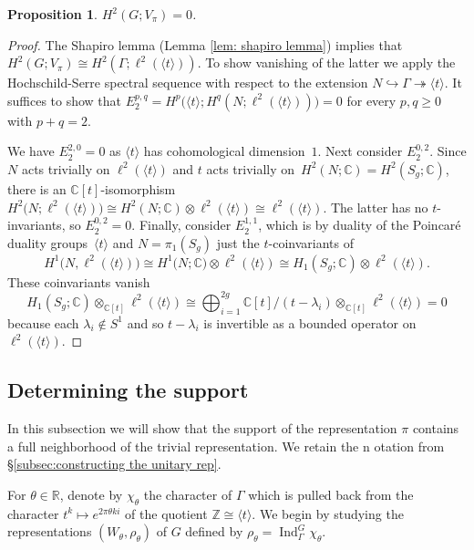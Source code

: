 \documentclass[12pt,reqno]{amsart}
\newcommand{\Z}{\mathbb{Z}}
\newcommand{\R}{\mathbb{R}}
\newcommand{\C}{\mathbb{C}}
\newtheorem{proposition}[theorem]{Proposition}
\theoremstyle{definition}
\newcommand{\Ind}{\operatorname{Ind}}
\begin{document}
\begin{proposition}\label{prop: H2pi=0}
 $H^2(G;V_\pi)=0$.
\end{proposition}

\begin{proof}
    The Shapiro lemma (Lemma \ref{lem: shapiro lemma}) implies that $H^2(G;V_\pi) \cong H^2(\Gamma;\ell^2(\langle t\rangle))$. To show vanishing of the latter we apply the Hochschild-Serre spectral sequence \cite[Theorem~9.1]{Blanc} with respect to the extension $N \hookrightarrow \Gamma \twoheadrightarrow \langle t \rangle$. It suffices to show that $E_2^{p,q}= H^p\bigl(\langle t \rangle; H^q(N;\ell^2(\langle t\rangle))\bigr)=0$ for every $p,q\ge 0$ with $p+q=2$. 

    We have $E_2^{2,0}=0$ as $\langle t\rangle$ has cohomological dimension~$1$. 
    Next consider $E_2^{0,2}$. 
    Since $N$ acts trivially on $\ell^2(\langle t\rangle)$ and $t$ acts trivially on~$H^2(N;\C)=H^2(S_g;\C)$,
    there is an $\C[t]$-isomorphism $H^2\bigl(N;\ell^2(\langle t\rangle)\bigr) \cong H^2(N;\C)\otimes \ell^2(\langle t\rangle)\cong \ell^2(\langle t\rangle)$.
    The latter has no $t$-invariants, so $E_2^{0,2}=0$. 
    Finally, consider $E_2^{1,1}$, which is by duality of the Poincar\'e duality groups~$\langle t\rangle$ and $N=\pi_1(S_g)$ just the $t$-coinvariants of
    \[ H^1\bigl( N, \ell^2(\langle t\rangle)\bigr)\cong H^1\bigl( N;\C\bigr)\otimes \ell^2(\langle t\rangle)\cong H_1(S_g;\C)\otimes \ell^2(\langle t\rangle).\]
    These coinvariants vanish 
    \[ H_1(S_g;\C)\otimes_{\C[t]} \ell^2(\langle t\rangle)\cong \bigoplus_{i=1}^{2g} \C[t]/(t-\lambda_i)\otimes_{\C[t]}\ell^2(\langle t\rangle)=0\]
    because each $\lambda_i\not\in S^1$ and so $t-\lambda_i$ is invertible as a bounded operator on $\ell^2(\langle t\rangle)$.
\end{proof}

\subsection{Determining the support}\label{subsec:7.2}

In this subsection we will show that the support of the representation $\pi$ contains a full neighborhood of the trivial representation. We retain the n  otation from \S\ref{subsec:constructing the unitary rep}.

For $\theta \in \R$, denote by $\chi_\theta$ the character of $\Gamma$ which is pulled back from the character $t^{k} \mapsto e^{2\pi \theta k i}$ of the quotient $\Z \cong \langle t \rangle$. We begin by studying the representations $(W_\theta,\rho_\theta)$ of $G$ defined by $\rho_\theta = \Ind^G_\Gamma \chi_\theta$.
\end{document}
